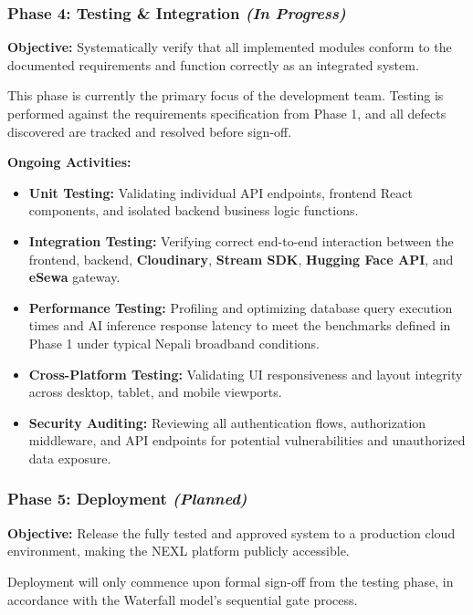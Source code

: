 \subsubsection*{Phase 4: Testing \& Integration \hfill \textit{(In Progress)}}

\textbf{Objective:} Systematically verify that all implemented modules conform to the documented requirements and function correctly as an integrated system.

This phase is currently the primary focus of the development team. Testing is performed against the requirements specification from Phase 1, and all defects discovered are tracked and resolved before sign-off.

\textbf{Ongoing Activities:}
\begin{itemize}
    \item \textbf{Unit Testing:} Validating individual API endpoints, frontend React components, and isolated backend business logic functions.
    \item \textbf{Integration Testing:} Verifying correct end-to-end interaction between the frontend, backend, \textbf{Cloudinary}, \textbf{Stream SDK}, \textbf{Hugging Face API}, and \textbf{eSewa} gateway.
    \item \textbf{Performance Testing:} Profiling and optimizing database query execution times and AI inference response latency to meet the benchmarks defined in Phase 1 under typical Nepali broadband conditions.
    \item \textbf{Cross-Platform Testing:} Validating UI responsiveness and layout integrity across desktop, tablet, and mobile viewports.
    \item \textbf{Security Auditing:} Reviewing all authentication flows, authorization middleware, and API endpoints for potential vulnerabilities and unauthorized data exposure.
\end{itemize}

\subsubsection*{Phase 5: Deployment \hfill \textit{(Planned)}}

\textbf{Objective:} Release the fully tested and approved system to a production cloud environment, making the NEXL platform publicly accessible.

Deployment will only commence upon formal sign-off from the testing phase, in accordance with the Waterfall model's sequential gate process.

